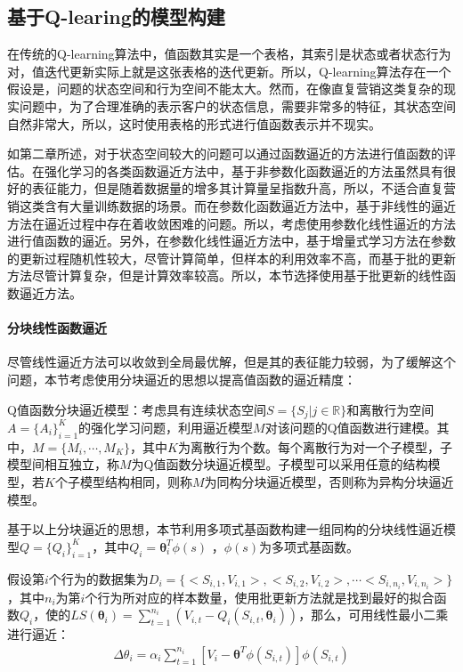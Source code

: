 \subsection{基于Q-learing的模型构建}
在传统的Q-learning算法中，值函数其实是一个表格，其索引是状态或者状态行为对，值迭代更新实际上就是这张表格的迭代更新。所以，Q-learning算法存在一个假设是，问题的状态空间和行为空间不能太大。然而，在像直复营销这类复杂的现实问题中，为了合理准确的表示客户的状态信息，需要非常多的特征，其状态空间自然非常大，所以，这时使用表格的形式进行值函数表示并不现实。

如第二章所述，对于状态空间较大的问题可以通过函数逼近的方法进行值函数的评估。在强化学习的各类函数逼近方法中，基于非参数化函数逼近的方法虽然具有很好的表征能力，但是随着数据量的增多其计算量呈指数升高，所以，不适合直复营销这类含有大量训练数据的场景。而在参数化函数逼近方法中，基于非线性的逼近方法在逼近过程中存在着收敛困难的问题。所以，考虑使用参数化线性逼近的方法进行值函数的逼近。另外，在参数化线性逼近方法中，基于增量式学习方法在参数的更新过程随机性较大，尽管计算简单，但样本的利用效率不高，而基于批的更新方法尽管计算复杂，但是计算效率较高。所以，本节选择使用基于批更新的线性函数逼近方法。

\paragraph{分块线性函数逼近}
尽管线性逼近方法可以收敛到全局最优解，但是其的表征能力较弱，为了缓解这个问题，本节考虑使用分块逼近的思想以提高值函数的逼近精度：

Q值函数分块逼近模型：考虑具有连续状态空间$S=\{S_{j}|j \in \mathbb{R}\}$和离散行为空间$A=\{A_{i}\}_{i=1}^{K}$的强化学习问题，利用逼近模型$M$对该问题的Q值函数进行建模。其中，$M=\{M_{i},\cdots,M_{K}\}$，其中$K$为离散行为个数。每个离散行为对一个子模型，子模型间相互独立，称$M$为Q值函数分块逼近模型。子模型可以采用任意的结构模型，若$K$个子模型结构相同，则称$M$为同构分块逼近模型，否则称为异构分块逼近模型。

基于以上分块逼近的思想，本节利用多项式基函数构建一组同构的分块线性逼近模型$Q=\{Q_{i}\}_{i=1}^{K}$，其中$Q_{i}=\bm{\theta}_{i}^{T} \phi(s)$ ，$\phi(s)$为多项式基函数。

假设第$i$个行为的数据集为$D_{i}=\{<S_{i,1},V_{i,1}>, <S_{i,2}, V_{i,2}>, \cdots <S_{i,n_{i}},V_{i,n_{i}}>\}$，其中$n_{i}$为第$i$个行为所对应的样本数量，使用批更新方法就是找到最好的拟合函数$Q_{i}$，使的$LS(\bm{\theta}_{i})=\sum_{t=1}^{n_{i}}(V_{i,t}-Q_{i}(S_{i,t},\bm{\theta}_{i}))$，那么，可用线性最小二乘进行逼近：
\begin{equation}\label{pifangfa}
\begin{aligned}
\Delta \theta_{i} = \alpha_{i} \sum_{t=1}^{n_{i}}[V_{i}-\bm{\theta}^{T} \phi(S_{i,t})] \phi(S_{i,t})
\end{aligned}
\end{equation}

